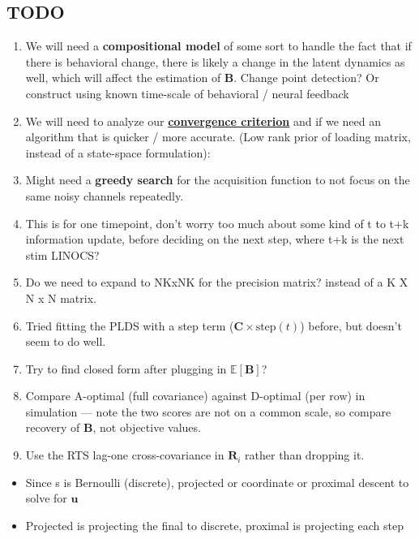 \documentclass[11pt,letterpaper]{article} %
\begin{document}
\subsection*{TODO}
\begin{enumerate}
    \item We will need a \textbf{compositional model} of some sort to handle the fact that if there is behavioral change, there is likely a change in the latent dynamics as well, which will affect the estimation of $\bm{B}$. Change point detection? Or construct using known time-scale of behavioral / neural feedback
    \item We will need to analyze our \hyperref[sec:convergence_criterion]{\textbf{convergence criterion}} and if we need an algorithm that is quicker / more accurate. (Low rank prior of loading matrix, instead of a state-space formulation): %
    \item Might need a \textbf{greedy search} for the acquisition function to not focus on the same noisy channels repeatedly.
    \item This is for one timepoint, don't worry too much about some kind of t to t+k information update, before deciding on the next step, where t+k is the next stim LINOCS?
    \item Do we need to expand to NKxNK for the precision matrix? instead of a K X N x N matrix.
    \item Tried fitting the PLDS with a step term ($\bm{C}\times \text{step}(t)$) before, but doesn't seem to do well.
    \item Try to find closed form after plugging in $\mathbb{E}\!\left[\bm{B}\right]$?
    \item Compare A-optimal (full covariance) against D-optimal (per row) in simulation --- note the two scores are not on a common scale, so compare recovery of $\bm{B}$, not objective values.
    \item Use the RTS lag-one cross-covariance in $\bm{R}_i$ rather than dropping it.
\end{enumerate}
\begin{itemize}
    \item Since s is Bernoulli (discrete), projected or coordinate or proximal descent to solve for $\bm{u}$
    \item Projected is projecting the final to discrete, proximal is projecting each step
\end{itemize}
\end{document}
